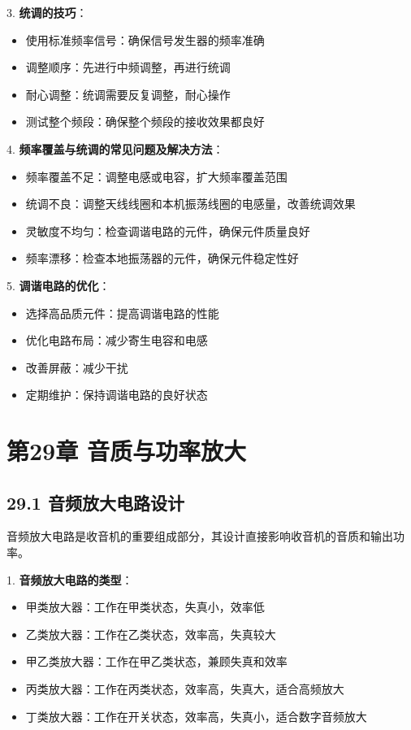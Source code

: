 \documentclass[12pt,UTF8]{ctexbook}
\begin{document}
3. \textbf{统调的技巧}：
   \begin{itemize}[leftmargin=3.5em]
   \item 使用标准频率信号：确保信号发生器的频率准确
   \item 调整顺序：先进行中频调整，再进行统调
   \item 耐心调整：统调需要反复调整，耐心操作
   \item 测试整个频段：确保整个频段的接收效果都良好
   \end{itemize}

4. \textbf{频率覆盖与统调的常见问题及解决方法}：
   \begin{itemize}[leftmargin=3.5em]
   \item 频率覆盖不足：调整电感或电容，扩大频率覆盖范围
   \item 统调不良：调整天线线圈和本机振荡线圈的电感量，改善统调效果
   \item 灵敏度不均匀：检查调谐电路的元件，确保元件质量良好
   \item 频率漂移：检查本地振荡器的元件，确保元件稳定性好
   \end{itemize}

5. \textbf{调谐电路的优化}：
   \begin{itemize}[leftmargin=3.5em]
   \item 选择高品质元件：提高调谐电路的性能
   \item 优化电路布局：减少寄生电容和电感
   \item 改善屏蔽：减少干扰
   \item 定期维护：保持调谐电路的良好状态
   \end{itemize}

\chapter*{第29章 音质与功率放大}
\section*{29.1 音频放大电路设计}

音频放大电路是收音机的重要组成部分，其设计直接影响收音机的音质和输出功率。

1. \textbf{音频放大电路的类型}：
   \begin{itemize}[leftmargin=3.5em]
   \item 甲类放大器：工作在甲类状态，失真小，效率低
   \item 乙类放大器：工作在乙类状态，效率高，失真较大
   \item 甲乙类放大器：工作在甲乙类状态，兼顾失真和效率
   \item 丙类放大器：工作在丙类状态，效率高，失真大，适合高频放大
   \item 丁类放大器：工作在开关状态，效率高，失真小，适合数字音频放大
   \end{itemize}
\end{document}
